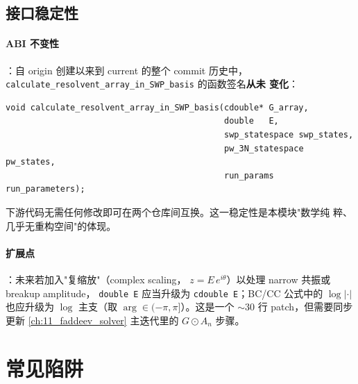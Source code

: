 \subsection{接口稳定性}
\label{subsec:ch10-stability}

\paragraph{ABI 不变性}：自 origin 创建以来到 current 的整个 commit 历史中，
\texttt{calculate\_resolvent\_array\_in\_SWP\_basis} 的函数签名\textbf{从未
变化}：

\begin{verbatim}
void calculate_resolvent_array_in_SWP_basis(cdouble* G_array,
                                            double   E,
                                            swp_statespace swp_states,
                                            pw_3N_statespace pw_states,
                                            run_params run_parameters);
\end{verbatim}

下游代码无需任何修改即可在两个仓库间互换。这一稳定性是本模块"数学纯
粹、几乎无重构空间"的体现。

\paragraph{扩展点}：未来若加入"复缩放"（complex scaling，
\(z = E\,e^{i\theta}\)）以处理 narrow 共振或 breakup amplitude，
\texttt{double E} 应当升级为 \texttt{cdouble E}；BC/CC 公式中的 \(\log|\cdot|\)
也应升级为 \(\log\) 主支（取 \(\arg \in (-\pi, \pi]\)）。这是一个 \(\sim 30\)
行 patch，但需要同步更新 \cref{ch:11_faddeev_solver} 主迭代里的
\(G \odot A_n\) 步骤。

\section{常见陷阱}
\label{sec:ch10-pitfalls}

